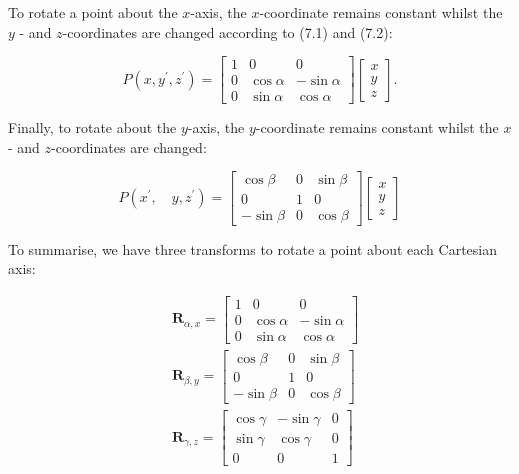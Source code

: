 \documentclass[10pt]{article}
\begin{document}
To rotate a point about the $x$-axis, the $x$-coordinate remains constant whilst the $y$ - and $z$-coordinates are changed according to (7.1) and (7.2):

$$
P\left(x, y^{\prime}, z^{\prime}\right)=\left[\begin{array}{ccc}
1 & 0 & 0 \\
0 & \cos \alpha & -\sin \alpha \\
0 & \sin \alpha & \cos \alpha
\end{array}\right]\left[\begin{array}{l}
x \\
y \\
z
\end{array}\right] .
$$

Finally, to rotate about the $y$-axis, the $y$-coordinate remains constant whilst the $x$ - and $z$-coordinates are changed:

$$
P\left(x^{\prime}, \quad y, z^{\prime}\right)=\left[\begin{array}{ccc}
\cos \beta & 0 & \sin \beta \\
0 & 1 & 0 \\
-\sin \beta & 0 & \cos \beta
\end{array}\right]\left[\begin{array}{l}
x \\
y \\
z
\end{array}\right]
$$

To summarise, we have three transforms to rotate a point about each Cartesian axis:

$$
\begin{aligned}
& \mathbf{R}_{\alpha, x}= {\left[\begin{array}{ccc}
1 & 0 & 0 \\
0 & \cos \alpha & -\sin \alpha \\
0 & \sin \alpha & \cos \alpha
\end{array}\right] } \\
& \mathbf{R}_{\beta, y}=\left[\begin{array}{ccc}
\cos \beta & 0 & \sin \beta \\
0 & 1 & 0 \\
-\sin \beta & 0 & \cos \beta
\end{array}\right] \\
& \mathbf{R}_{\gamma, z}=\left[\begin{array}{ccc}
\cos \gamma & -\sin \gamma & 0 \\
\sin \gamma & \cos \gamma & 0 \\
0 & 0 & 1
\end{array}\right]
\end{aligned}
$$
\end{document}
